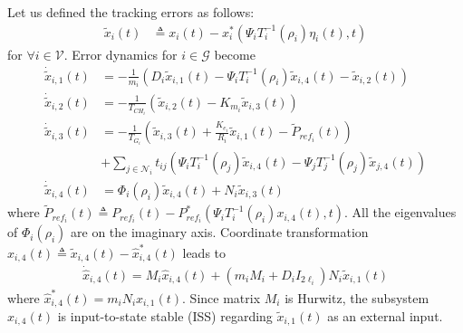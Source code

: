\documentclass[journal]{IEEEtran}
\newcommand{\nnum}{\nonumber}
\newcommand{\GG}{{\mathcal{G}}}
\newcommand{\NN}{{\mathcal{N}}}
\newcommand{\VV}{{\mathcal{V}}}
\begin{document}
Let us defined the tracking errors as follows: \begin{align} \tilde{x}_i(t)&\triangleq x_i(t)-x_i^*(\Psi_{i}T_i^{-1}(\rho_i)\eta_i(t),t) \label{e11_f0} \end{align} for $\forall i \in \VV$. Error dynamics for $i \in \GG$ become \begin{align} \dot{\tilde{x}}_{i,1}(t) &=  -\frac{1}{m_i}(D_i\tilde{x}_{i,1}(t)-\Psi_iT_i^{-1}(\rho_i)\tilde{x}_{i,4}(t)-\tilde{x}_{i,2}(t))\nnum\\ \dot{\tilde{x}}_{i,2}(t) &=  -\frac{1}{T_{CH_i}}(\tilde{x}_{i,2}(t)-K_{m_i}\tilde{x}_{i,3}(t))\nnum\\ \dot{\tilde{x}}_{i,3}(t) &=  -\frac{1}{T_{G_i}}(\tilde{x}_{i,3}(t)+\frac{K_{e_i}}{R_i}\tilde{x}_{i,1}(t)-\tilde{P}_{ref_i}(t))\nnum\\ &+\sum_{j \in \NN_i}t_{ij}(\Psi_iT_i^{-1}(\rho_j)\tilde{x}_{i,4}(t)-\Psi_jT_j^{-1}(\rho_j)\tilde{x}_{j,4}(t))\nnum\\ \dot{\tilde{x}}_{i,4}(t) &= \Phi_i(\rho_i)\tilde{x}_{i,4}(t) + N_i \tilde{x}_{i,3}(t) \label{e11_f1} \end{align} where $\tilde{P}_{ref_i}(t) \triangleq P_{ref_i}(t)-P_{ref_i}^*(\Psi_{i}T_i^{-1}(\rho_i)x_{i,4}(t),t)$. All the eigenvalues of $\Phi_i(\rho_i)$ are on the imaginary axis. Coordinate transformation $\hat{x}_{i,4}(t) \triangleq \tilde{x}_{i,4}(t) - \hat{x}_{i,4}^*(t)$ leads to \begin{align*} \dot{\hat{x}}_{i,4}(t) = M_i\hat{x}_{i,4}(t) + (m_iM_i+D_i I_{2\ell_i})N_i\tilde{x}_{i,1}(t) \end{align*} where $\hat{x}_{i,4}^*(t) = m_iN_i x_{i,1}(t)$. Since matrix $M_i$ is Hurwitz, the subsystem $\hat{x}_{i,4}(t)$ is input-to-state stable (ISS) regarding $\tilde{x}_{i,1}(t)$ as an external input.
\end{document}

